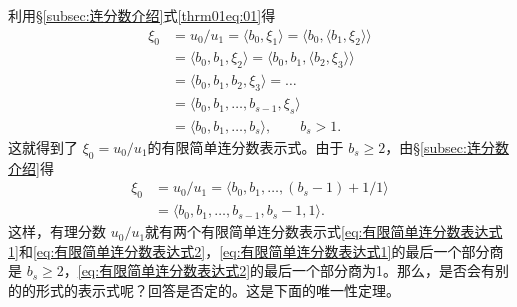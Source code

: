 \begin{theorem}
	利用\S \ref{subsec:连分数介绍}式\eqref{thrm01eq:01}得
	\begin{align}
		\xi_0 & = u_0 / u_1 = \langle b_0, \xi_1 \rangle = \langle b_0, \langle b_1, \xi_2 \rangle \rangle \nonumber \\
		      & = \langle b_0, b_1, \xi_2 \rangle = \langle b_0, b_1, \langle b_2, \xi_3 \rangle \rangle   \nonumber \\
		      & = \langle b_0, b_1, b_2, \xi_3 \rangle = \dots \nonumber                                             \\
		      & = \langle b_0, b_1, \dots, b_{s-1}, \xi_s \rangle \nonumber                                          \\
		      & = \langle b_0, b_1, \dots, b_s \rangle, \qquad b_s > 1. \label{eq:有限简单连分数表达式1}
	\end{align}
	这就得到了 \( \xi_0 = u_0 / u_1 \)的有限简单连分数表示式。由于 \( b_s \ge 2 \)，由\S \ref{subsec:连分数介绍}得
	\begin{align}
		\xi_0 & = u_0 / u_1 = \langle b_0, b_1, \dots, (b_s - 1) + 1/1 \rangle\nonumber                  \\
		      & = \langle b_0, b_1, \dots, b_{s-1}, b_s - 1, 1 \rangle. \label{eq:有限简单连分数表达式2}
	\end{align}
	这样，有理分数 \( u_0 / u_1
	\)就有两个有限简单连分数表示式\eqref{eq:有限简单连分数表达式1}和\eqref{eq:有限简单连分数表达式2}，\eqref{eq:有限简单连分数表达式1}的最后一个部分商是
	\( b_s \ge 2
	\)，\eqref{eq:有限简单连分数表达式2}的最后一个部分商为1。那么，是否会有别的的形式的表示式呢？回答是否定的。这是下面的唯一性定理。
\end{theorem}

